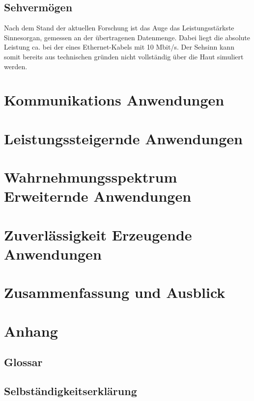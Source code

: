 \documentclass{llncs}					%
\begin{document}
\subsection{Sehvermögen}
Nach dem Stand der aktuellen Forschung ist das Auge das Leistungsstärkste Sinnesorgan, gemessen an der übertragenen Datenmenge\cite{Koch2006}. Dabei liegt die absolute Leistung ca. bei der eines Ethernet-Kabels mit 10 Mbit/s\cite{Koch2006}. Der Sehsinn kann somit bereits aus technischen gründen nicht vollständig über die Haut simuliert werden.
\section{Kommunikations Anwendungen}

\section{Leistungssteigernde Anwendungen}

\section{Wahrnehmungsspektrum Erweiternde Anwendungen}

\section{Zuverlässigkeit Erzeugende Anwendungen}

\section{Zusammenfassung und Ausblick}

\section{Anhang}

\clearpage
\subsection{Glossar}\label{glossar}

\renewcommand*{\glossarysection}[2][]{}	%
\printnoidxglossaries				%

\subsection{Selbständigkeitserklärung}

\clearpage

\end{document}
